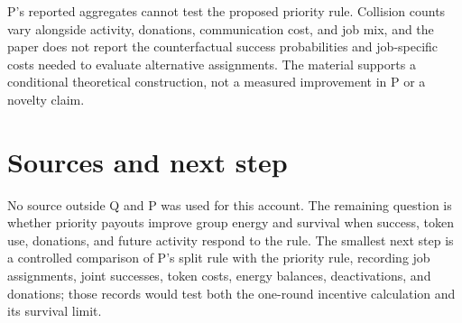 \documentclass{article}
\begin{document}
P's reported aggregates cannot test the proposed priority rule. Collision counts vary alongside activity, donations, communication cost, and job mix, and the paper does not report the counterfactual success probabilities and job-specific costs needed to evaluate alternative assignments. The material supports a conditional theoretical construction, not a measured improvement in P or a novelty claim. 

\section*{Sources and next step}

No source outside Q and P was used for this account. The remaining question is whether priority payouts improve group energy and survival when success, token use, donations, and future activity respond to the rule. The smallest next step is a controlled comparison of P's split rule with the priority rule, recording job assignments, joint successes, token costs, energy balances, deactivations, and donations; those records would test both the one-round incentive calculation and its survival limit. 
\end{document}
